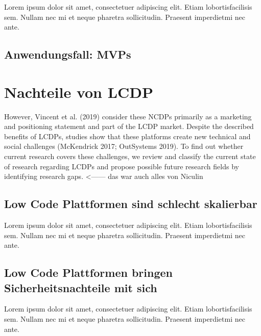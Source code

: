 \documentclass{article}
\begin{document}
	
	
	 
	Lorem  ipsum  dolor  sit  amet,  consectetuer  adipiscing  
	elit.   Etiam  lobortisfacilisis sem.  Nullam nec mi et 
	neque pharetra sollicitudin.  Praesent imperdietmi nec ante.
	
	
	\subsection{Anwendungsfall: MVPs} 
	
	\section{Nachteile von LCDP}
	However, Vincent et al. (2019) consider these NCDPs primarily as a marketing and positioning statement and part of the LCDP market. Despite the described benefits of LCDPs, studies show that these platforms create new technical and social challenges (McKendrick 2017; OutSystems 2019). To find out whether current research covers these challenges, we
	review and classify the current state of research regarding LCDPs and propose possible future research fields by identifying research gaps. <------ das war auch alles von Niculin
	
	\subsection{Low Code Plattformen sind schlecht skalierbar}	
	Lorem  ipsum  dolor  sit  amet,  consectetuer  adipiscing  
	elit.   Etiam  lobortisfacilisis sem.  Nullam nec mi et 
	neque pharetra sollicitudin.  Praesent imperdietmi nec ante.
	
	\subsection{Low Code Plattformen bringen Sicherheitsnachteile mit sich}	
	Lorem  ipsum  dolor  sit  amet,  consectetuer  adipiscing  
	elit.   Etiam  lobortisfacilisis sem.  Nullam nec mi et 
	neque pharetra sollicitudin.  Praesent imperdietmi nec ante.  
	
\end{document}
